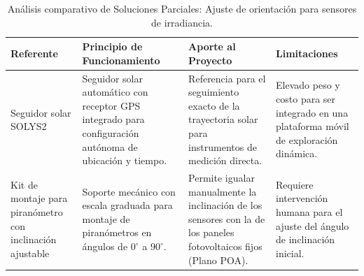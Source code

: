 \begin{table}[H]
	\centering
	\footnotesize
	\caption{Análisis comparativo de Soluciones Parciales: Ajuste de orientación para sensores de irradiancia.}
	\label{tab:estado_arte_ajuste_sensores}
	\begin{tabularx}{\textwidth}{|p{3.5cm}|>{\raggedright\arraybackslash}X|>{\raggedright\arraybackslash}X|>{\raggedright\arraybackslash}X|}
		\hline
		\rowcolor[HTML]{D9E1F2} 
		\textbf{Referente} & \textbf{Principio de Funcionamiento} & \textbf{Aporte al Proyecto} & \textbf{Limitaciones} \\ \hline
		Seguidor solar SOLYS2 & Seguidor solar automático con receptor GPS integrado para configuración autónoma de ubicación y tiempo. & Referencia para el seguimiento exacto de la trayectoria solar para instrumentos de medición directa. & Elevado peso y costo para ser integrado en una plataforma móvil de exploración dinámica. \\ \hline
		Kit de montaje para piranómetro con inclinación ajustable & Soporte mecánico con escala graduada para montaje de piranómetros en ángulos de $0^{\circ}$ a $90^{\circ}$. & Permite igualar manualmente la inclinación de los sensores con la de los paneles fotovoltaicos fijos (Plano POA). & Requiere intervención humana para el ajuste del ángulo de inclinación inicial. \\ \hline
	\end{tabularx}
\end{table}
%
%


